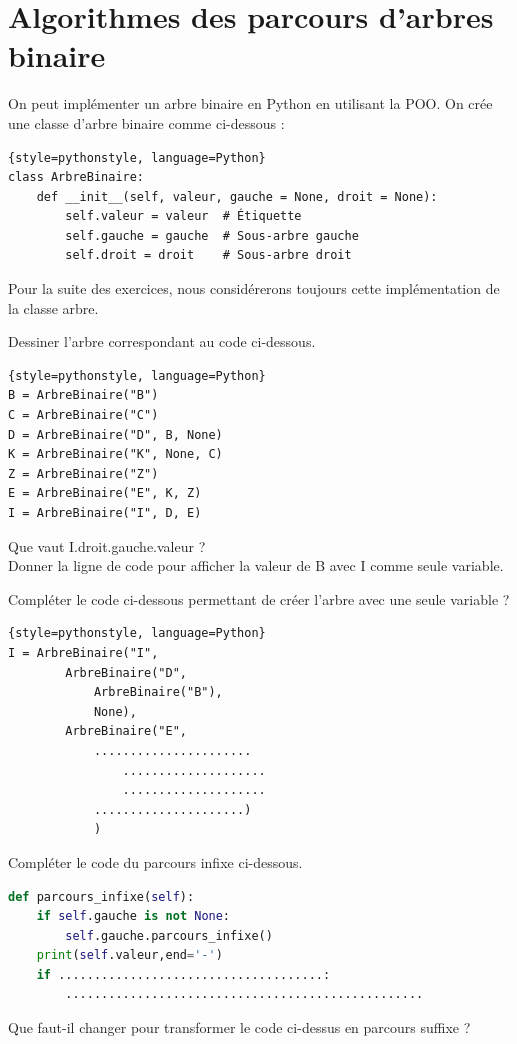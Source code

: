 \setcounter{Exercise}{0}
\section*{Algorithmes des parcours d'arbres binaire}
On peut implémenter un arbre binaire en Python en utilisant la POO. On crée une classe d'arbre binaire comme ci-dessous :
\begin{lstlisting}{style=pythonstyle, language=Python}
class ArbreBinaire:
    def __init__(self, valeur, gauche = None, droit = None):
        self.valeur = valeur  # Étiquette
        self.gauche = gauche  # Sous-arbre gauche
        self.droit = droit    # Sous-arbre droit
\end{lstlisting}
Pour la suite des exercices, nous considérerons toujours cette implémentation de la classe arbre.

\begin{Exercise}[title={Dessinons}]

\Question Dessiner l'arbre correspondant au code ci-dessous.\\
\emptybox{5cm}
\begin{lstlisting}{style=pythonstyle, language=Python}
B = ArbreBinaire("B")
C = ArbreBinaire("C")
D = ArbreBinaire("D", B, None)
K = ArbreBinaire("K", None, C)
Z = ArbreBinaire("Z")
E = ArbreBinaire("E", K, Z)
I = ArbreBinaire("I", D, E)
\end{lstlisting}

\Question Que vaut I.droit.gauche.valeur ?\\
\emptybox{1cm}
\Question Donner la ligne de code pour afficher la valeur de B avec I comme seule variable.\\
\emptybox{1cm}

\Question Compléter le code ci-dessous permettant de créer l'arbre avec une seule variable  ?\\
\begin{lstlisting}{style=pythonstyle, language=Python}
I = ArbreBinaire("I",
        ArbreBinaire("D",
            ArbreBinaire("B"),
            None),
        ArbreBinaire("E",
            ......................
                ....................
                ....................
            .....................)
            )    
\end{lstlisting}
\end{Exercise}

\vfill

\begin{Exercise}[title={Parcours infixe et suffixe}]

    \Question Compléter le code du parcours infixe ci-dessous.
    \begin{lstlisting}[style=pythonstyle, language=Python]
def parcours_infixe(self):
    if self.gauche is not None:
        self.gauche.parcours_infixe()
    print(self.valeur,end='-')
    if .....................................:
        ..................................................
    \end{lstlisting}
    \Question Que faut-il changer pour transformer le code ci-dessus en parcours suffixe ?\\
    \emptybox{4cm}
\end{Exercise}

